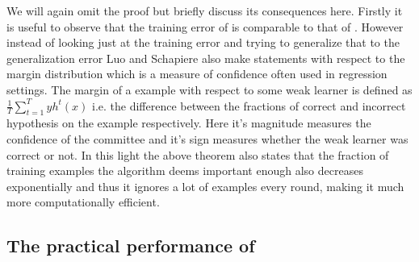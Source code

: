  We will again omit the proof but briefly discuss its consequences here. Firstly it is useful to observe that the training error of \NHB is comparable to that of \adaB. However instead of looking just at the training error and trying to generalize that to the generalization error Luo and Schapiere also make statements with respect to the margin distribution which is a measure of confidence often used in regression settings. The margin of a example with respect to some weak learner is defined as $\frac1T \sum^T_{t=1}yh^t(x)$ i.e. the difference between the fractions of correct and incorrect hypothesis on the example respectively. Here it's magnitude measures the confidence of the committee and it's sign measures whether the weak learner was correct or not. In this light the above theorem also states that the fraction of training examples the algorithm deems important enough also decreases exponentially and thus it ignores a lot of examples every round, making it much more computationally efficient. 

 \subsection{The practical performance of \NHB}
 \label{subsec:NHPracPerf}
